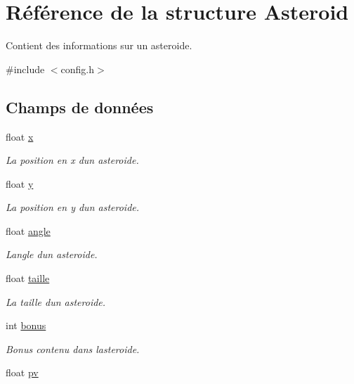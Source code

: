 \hypertarget{struct_asteroid}{}\section{Référence de la structure Asteroid}
\label{struct_asteroid}


Contient des informations sur un asteroide.  




{\ttfamily \#include $<$config.\+h$>$}

\subsection*{Champs de données}
\begin{DoxyCompactItemize}
\item 
float \hyperlink{struct_asteroid_a3b05c8b9f528323c232c38f103071917}{x}
\begin{DoxyCompactList}\small\item\em La position en x d\textquotesingle{}un asteroide. \end{DoxyCompactList}\item 
float \hyperlink{struct_asteroid_a57a2284d0f05d0d32275269b2dca2f6c}{y}
\begin{DoxyCompactList}\small\item\em La position en y d\textquotesingle{}un asteroide. \end{DoxyCompactList}\item 
float \hyperlink{struct_asteroid_abdc5722d109d6c0a9e3a68cbf1ccaeb4}{angle}
\begin{DoxyCompactList}\small\item\em L\textquotesingle{}angle d\textquotesingle{}un asteroide. \end{DoxyCompactList}\item 
float \hyperlink{struct_asteroid_a4d46d98d942b121e9ccbacdf527f9666}{taille}
\begin{DoxyCompactList}\small\item\em La taille d\textquotesingle{}un asteroide. \end{DoxyCompactList}\item 
int \hyperlink{struct_asteroid_a7cccabaead9b22abbb00bbcfb1f200b5}{bonus}
\begin{DoxyCompactList}\small\item\em Bonus contenu dans l\textquotesingle{}asteroide. \end{DoxyCompactList}\item 
float \hyperlink{struct_asteroid_a3700f8d0c8cc68782f266635be742ca5}{pv}

\end{DoxyCompactItemize}
